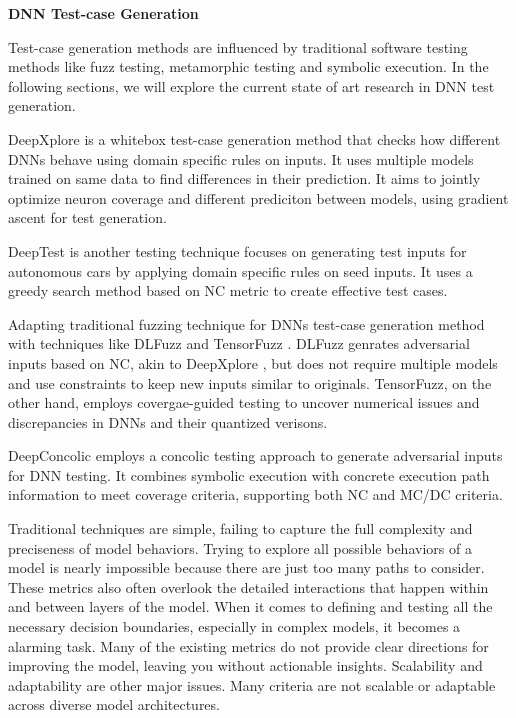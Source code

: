 \documentclass[10pt, conference, a4paper, final]{IEEEtran}
\begin{document}
\smallskip\noindent%
\textbf{DNN Test-case Generation}



Test-case generation methods are influenced by traditional software testing methods like fuzz testing, metamorphic testing and symbolic execution. In the following sections, we will explore the current state of art research in DNN test generation.

DeepXplore \cite{deepxplore} is a whitebox test-case generation method that checks how different DNNs behave using domain specific rules on inputs. It uses multiple models trained on same data to find differences in their prediction. It aims to jointly optimize neuron coverage and different prediciton  between models, using gradient ascent for test generation.


DeepTest \cite{deeptest} is another testing technique focuses on generating test inputs for autonomous cars by applying domain specific rules on seed inputs. It uses a greedy search method based on NC metric to create effective test cases.

Adapting traditional fuzzing technique for DNNs test-case generation method with techniques like DLFuzz \cite{dlfuzz} and TensorFuzz \cite{tensorfuzz}. DLFuzz genrates adversarial inputs based on NC, akin to DeepXplore \cite{deepxplore}, but does not require multiple models and use constraints to keep new inputs similar to originals. TensorFuzz, on the other hand, employs covergae-guided testing to uncover numerical issues and discrepancies in DNNs and their quantized verisons.

DeepConcolic \cite{deepconcolic} employs a concolic testing approach to generate adversarial inputs for DNN testing. It combines symbolic execution with concrete execution path information to meet coverage criteria, supporting both NC and MC/DC criteria.


Traditional techniques are simple, failing to capture the full complexity and preciseness of model behaviors. Trying to explore all possible behaviors of a model is nearly impossible because there are just too many paths to consider. These metrics also often overlook the detailed interactions that happen within and between layers of the model. When it comes to defining and testing all the necessary decision boundaries, especially in complex models, it becomes a alarming task.  Many of the existing metrics do not provide clear directions for improving the model, leaving you without actionable insights. Scalability and adaptability are other major issues. Many criteria are not scalable or adaptable across diverse model architectures.
\end{document}

